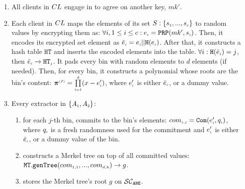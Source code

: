 \begin{enumerate}
\item\label{e-psi::gen-mk-prime} All clients in ${CL}$ engage in \ct to agree on another key, $mk'$.
%
\item\label{Smart-PSI:encode-elem} Each client  in ${CL}$ maps the elements of its set $S:\{ s_{\scriptscriptstyle 1},..., s_{\scriptscriptstyle c}\}$ to random values by encrypting them as: $\forall i, 1\leq i\leq c: e_{\scriptscriptstyle i}=\mathtt{PRP}(mk', s_{\scriptscriptstyle i})$. 
%
Then, it encodes its encrypted set element as $\bar{e}_{\scriptscriptstyle i} =e_{\scriptscriptstyle i} || \mathtt{H}(e_{\scriptscriptstyle i})$.  
%
After that, it constructs a hash table  $\mathtt{HT}$ and inserts the encoded elements into the table. $\forall i: \mathtt{H}( \bar{e}_{\scriptscriptstyle i})={ {  {j}}}$, then $\bar{e}_{\scriptscriptstyle i}\rightarrow \mathtt{HT}_{\scriptscriptstyle {  {j}}}$. It pads every bin with random elements to $d$ elements (if needed). Then,  for every bin, it constructs a polynomial whose roots are  the bin's content: $\bm\pi^{\scriptscriptstyle { {(I)}}}=\prod\limits^{\scriptscriptstyle d}_{\scriptscriptstyle i=1} (x-e'_{\scriptscriptstyle i})$, where $e'_{\scriptscriptstyle i}$ is either $\bar{e}_{\scriptscriptstyle i}$, or a dummy value. 




\item\label{merkel-tree-cons} Every extractor in $\{A_{\scriptscriptstyle 1}, A_{\scriptscriptstyle 2}\}$: 

\begin{enumerate}
%
%
\item\label{smart-PSI::commit-to-bin} for each $j$-th bin, commits to the bin's elements: $com_{\scriptscriptstyle{i,j}}=\mathtt{Com}(e'_{\scriptscriptstyle i}, q_{\scriptscriptstyle i})$, where $q_{\scriptscriptstyle i}$ is a fresh randomness  used for the commitment and $e'_{\scriptscriptstyle i}$ is either $\bar{e}_{\scriptscriptstyle i}$, or a dummy value of the bin. %




\item  constructs a Merkel tree on top of all committed values: $\mathtt{MT.genTree}(com_{\scriptscriptstyle 1,1},...,com_{\scriptscriptstyle d,h})\rightarrow g$. %
\item stores the Merkel tree's root $g$ on $\mathcal{SC}_{\mathtt{ANE}}$.
\end{enumerate}



\end{enumerate}
